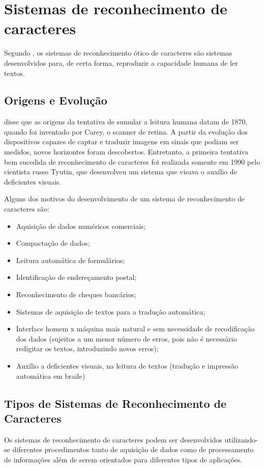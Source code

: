 \section{Sistemas de reconhecimento de caracteres}
Segundo \cite{silva2003reconhecimento}, os sistemas de reconhecimento ótico de caracteres são sistemas desenvolvidos para, de certa forma, reproduzir a capacidade humana de ler textos.

	\subsection{Origens e Evolução}
	\cite{man1986pattern} disse que as origens da tentativa de sumular a leitura humana datam de 1870, quando foi inventado por Carey, o scanner de retina. A partir da evolução dos dispositivos capazes de captar e traduzir imagens em sinais que podiam ser medidos, novos horizontes foram descobertos. Entretanto, a primeira tentativa bem sucedida de reconhecimento de caracteres foi realizada somente em 1990 pelo cientista russo Tyutin, que desenvolveu um sistema que visava o auxílio de deficientes visuais.
	
	Alguns dos motivos do desenvolvimento de um sistema de reconhecimento de caracteres são:
	\begin{itemize}
		\item Aquisição de dados numéricos comerciais;
		\item Compactação de dados;
		\item Leitura automática de formulários;
		\item Identificação de endereçamento postal;
		\item Reconhecimento de cheques bancários;
		\item Sistemas de aquisição de textos para a tradução automática;
		\item Interface homem x máquina mais natural e sem necessidade de recodificação dos dados (sujeitos a um menor número de erros, pois não é necessário redigitar os textos, introduzindo novos erros);
		\item Auxílio a deficientes visuais, na leitura de textos (tradução e impressão automática em braile)
	\end{itemize}

	\subsection{Tipos de Sistemas de Reconhecimento de Caracteres}
	Os sistemas de reconhecimento de caracteres podem ser desenvolvidos utilizando-se diferentes procedimentos tanto de aquisição de dados como de processamento de informações além de serem orientados para diferentes tipos de aplicações.
	
